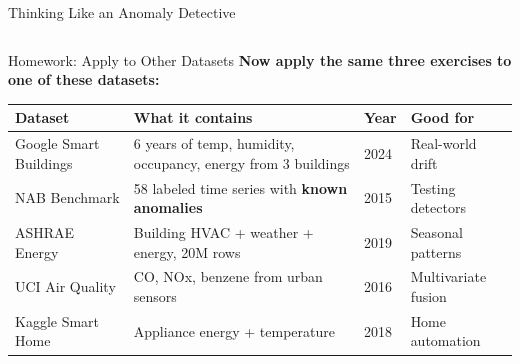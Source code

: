 \documentclass[aspectratio=169,11pt]{beamer}
\begin{document}
\begin{frame}[shrink=5]{Thinking Like an Anomaly Detective}
\begin{columns}
        \vspace{0.15cm}
    \end{columns}
\end{frame}

\begin{frame}[shrink=5]{Homework: Apply to Other Datasets}
    \textbf{Now apply the same three exercises to one of these datasets:}

    \vspace{0.15cm}
    \footnotesize
    \begin{tabular}{p{3.2cm}p{4cm}p{2.3cm}p{2.5cm}}
        \toprule
        \textbf{Dataset} & \textbf{What it contains} & \textbf{Year} & \textbf{Good for} \\
        \midrule
        Google Smart Buildings & 6 years of temp, humidity, occupancy, energy from 3 buildings & 2024 & Real-world drift \\
        \midrule
        NAB Benchmark & 58 labeled time series with \textbf{known anomalies} & 2015 & Testing detectors \\
        \midrule
        ASHRAE Energy & Building HVAC + weather + energy, 20M rows & 2019 & Seasonal patterns \\
        \midrule
        UCI Air Quality & CO, NOx, benzene from urban sensors & 2016 & Multivariate fusion \\
        \midrule
        Kaggle Smart Home & Appliance energy + temperature & 2018 & Home automation \\
        \bottomrule
    \end{tabular}
    \normalsize

    \vspace{0.15cm}
    \begin{columns}


\end{columns}
\end{frame}
\end{document}
